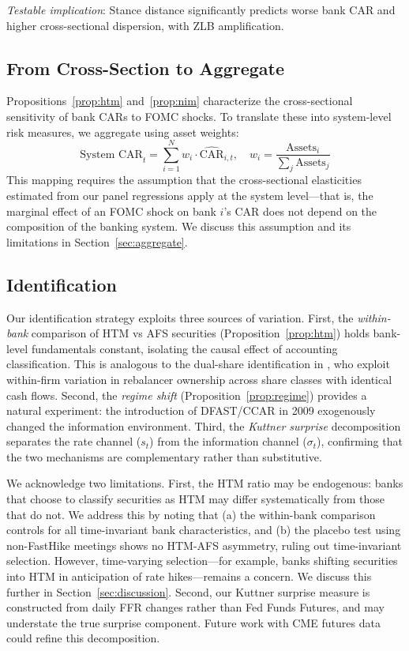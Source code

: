\documentclass[12pt,a4paper]{article}
\begin{document}
\noindent\textit{Testable implication}: Stance distance significantly predicts worse bank CAR and higher cross-sectional dispersion, with ZLB amplification.

\subsection{From Cross-Section to Aggregate}

Propositions~\ref{prop:htm} and~\ref{prop:nim} characterize the cross-sectional sensitivity of bank CARs to FOMC shocks. To translate these into system-level risk measures, we aggregate using asset weights:
\begin{equation}\label{eq:aggregate}
\text{System CAR}_t = \sum_{i=1}^{N} w_i \cdot \widehat{\text{CAR}}_{i,t}, \quad w_i = \frac{\text{Assets}_i}{\sum_j \text{Assets}_j}
\end{equation}
This mapping requires the assumption that the cross-sectional elasticities estimated from our panel regressions apply at the system level---that is, the marginal effect of an FOMC shock on bank $i$'s CAR does not depend on the composition of the banking system. We discuss this assumption and its limitations in Section~\ref{sec:aggregate}.

\subsection{Identification}

Our identification strategy exploits three sources of variation. First, the \textit{within-bank} comparison of HTM vs AFS securities (Proposition~\ref{prop:htm}) holds bank-level fundamentals constant, isolating the causal effect of accounting classification. This is analogous to the dual-share identification in \citet{LuWu2024}, who exploit within-firm variation in rebalancer ownership across share classes with identical cash flows. Second, the \textit{regime shift} (Proposition~\ref{prop:regime}) provides a natural experiment: the introduction of DFAST/CCAR in 2009 exogenously changed the information environment. Third, the \textit{Kuttner surprise} decomposition separates the rate channel ($s_t$) from the information channel ($\sigma_t$), confirming that the two mechanisms are complementary rather than substitutive.

We acknowledge two limitations. First, the HTM ratio may be endogenous: banks that choose to classify securities as HTM may differ systematically from those that do not. We address this by noting that (a) the within-bank comparison controls for all time-invariant bank characteristics, and (b) the placebo test using non-FastHike meetings shows no HTM-AFS asymmetry, ruling out time-invariant selection. However, time-varying selection---for example, banks shifting securities into HTM in anticipation of rate hikes---remains a concern. We discuss this further in Section~\ref{sec:discussion}. Second, our Kuttner surprise measure is constructed from daily FFR changes rather than Fed Funds Futures, and may understate the true surprise component. Future work with CME futures data could refine this decomposition.
\end{document}

